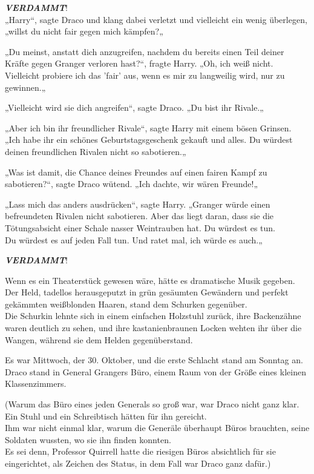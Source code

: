 {\textbf{\emph{VERDAMMT}}!\\ „Harry“, sagte Draco und klang dabei verletzt und vielleicht ein wenig überlegen,\\ „willst du nicht fair gegen mich kämpfen?„

„Du meinst, anstatt dich anzugreifen, nachdem du bereits einen Teil deiner Kräfte gegen Granger verloren hast?“, fragte Harry. „Oh, ich weiß nicht. Vielleicht probiere ich das 'fair' aus, wenn es mir zu langweilig wird, nur zu gewinnen.„

„Vielleicht wird sie dich angreifen“, sagte Draco. „Du bist ihr Rivale.„

„Aber ich bin ihr freundlicher Rivale“, sagte Harry mit einem bösen Grinsen.\\ „Ich habe ihr ein schönes Geburtstagsgeschenk gekauft und alles. Du würdest deinen freundlichen Rivalen nicht so sabotieren.„

„Was ist damit, die Chance deines Freundes auf einen fairen Kampf zu sabotieren?“, sagte Draco wütend. „Ich dachte, wir wären Freunde!„

„Lass mich das anders ausdrücken“, sagte Harry. „Granger würde einen befreundeten Rivalen nicht sabotieren. Aber das liegt daran, dass sie die Tötungsabsicht einer Schale nasser Weintrauben hat. Du würdest es tun.\\ Du würdest es auf jeden Fall tun. Und ratet mal, ich würde es auch.„

\textbf{\emph{VERDAMMT}}!

Wenn es ein Theaterstück gewesen wäre, hätte es dramatische Musik gegeben.\\ Der Held, tadellos herausgeputzt in grün gesäumten Gewändern und perfekt gekämmten weißblonden Haaren, stand dem Schurken gegenüber.\\ Die Schurkin lehnte sich in einem einfachen Holzstuhl zurück, ihre Backenzähne waren deutlich zu sehen, und ihre kastanienbraunen Locken wehten ihr über die Wangen, während sie dem Helden gegenüberstand.

Es war Mittwoch, der 30. Oktober, und die erste Schlacht stand am Sonntag an. Draco stand in General Grangers Büro, einem Raum von der Größe eines kleinen Klassenzimmers.

(Warum das Büro eines jeden Generals so groß war, war Draco nicht ganz klar. Ein Stuhl und ein Schreibtisch hätten für ihn gereicht.\\ Ihm war nicht einmal klar, warum die Generäle überhaupt Büros brauchten, seine Soldaten wussten, wo sie ihn finden konnten.\\ Es sei denn, Professor Quirrell hatte die riesigen Büros absichtlich für sie eingerichtet, als Zeichen des Status, in dem Fall war Draco ganz dafür.)

}
